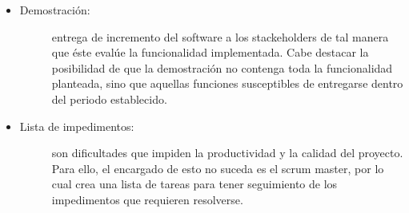\begin{itemize}
    \item   \begin{description}
                \item[Demostración:] entrega de incremento del software a los stackeholders de tal manera que éste evalúe la funcionalidad implementada. Cabe destacar la posibilidad de que la demostración no contenga toda la funcionalidad planteada, sino que aquellas funciones susceptibles de entregarse dentro del periodo establecido.
            \end{description}
    
    \item   \begin{description}
                \item[Lista de impedimentos: ]  son dificultades que impiden la productividad y la calidad del proyecto. Para ello, el encargado de esto no suceda es el scrum master, por lo cual crea una lista de tareas para tener seguimiento de los impedimentos que requieren resolverse. 
        
            \end{description}
\end{itemize}

